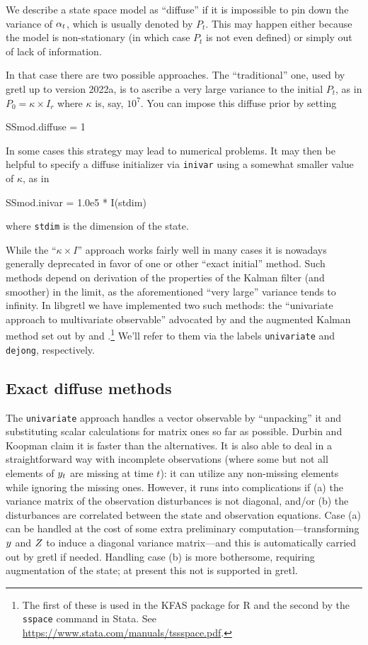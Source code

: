 We describe a state space model as ``diffuse'' if it is impossible to
pin down the variance of $\alpha_t$, which is usually denoted by
$P_t$. This may happen either because the model is non-stationary (in
which case $P_t$ is not even defined) or simply out of lack of
information.

In that case there are two possible approaches. The ``traditional''
one, used by gretl up to version 2022a, is to ascribe a very large
variance to the initial $P_t$, as in $P_0 = \kappa \times I_r$ where
$\kappa$ is, say, $10^7$. You can impose this diffuse prior by
setting %
\begin{code}
SSmod.diffuse = 1
\end{code}
In some cases this strategy may lead to numerical problems. It may
then be helpful to specify a diffuse initializer via \texttt{inivar}
using a somewhat smaller value of $\kappa$, as in
%
\begin{code}
SSmod.inivar = 1.0e5 * I(stdim)
\end{code}
where \texttt{stdim} is the dimension of the state.

While the ``$\kappa \times I$'' approach works fairly well in many
cases it is nowadays generally deprecated in favor of one or other
``exact initial'' method. Such methods depend on derivation of the
properties of the Kalman filter (and smoother) in the limit, as the
aforementioned ``very large'' variance tends to infinity. In libgretl
we have implemented two such methods: the ``univariate approach to
multivariate observable'' advocated by \cite{durbin-koopman12} and the
augmented Kalman method set out by \cite{dejong91} and
\cite{dejong-lin03}.\footnote{The first of these is used in the
  \textsf{KFAS} package for \textsf{R} \citep{helske17} and the second
  by the \texttt{sspace} command in \textsf{Stata}. See
  \url{https://www.stata.com/manuals/tssspace.pdf}.} We'll refer to
them via the labels \texttt{univariate} and \texttt{dejong},
respectively.

\subsection{Exact diffuse methods}

The \texttt{univariate} approach handles a vector observable by
``unpacking'' it and substituting scalar calculations for matrix ones
so far as possible. Durbin and Koopman claim it is faster than the
alternatives. It is also able to deal in a straightforward way with
incomplete observations (where some but not all elements of
$y_t$ are missing at time $t$): it can utilize any non-missing
elements while ignoring the missing ones.  However, it runs into
complications if (a) the variance matrix of the observation
disturbances is not diagonal, and/or (b) the disturbances are
correlated between the state and observation equations. Case (a) can
be handled at the cost of some extra preliminary
computation---transforming $y$ and $Z$ to induce a
diagonal variance matrix---and this is automatically carried out by
gretl if needed. Handling case (b) is more bothersome, requiring
augmentation of the state; at present this not is supported in gretl.

